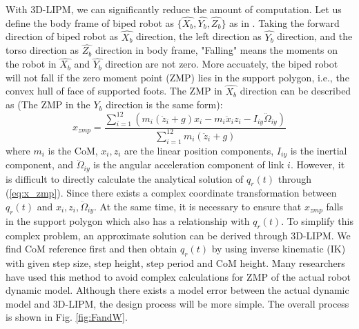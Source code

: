 \documentclass{ieeeaccess}
\begin{document}
With 3D-LIPM, we can significantly reduce the amount of computation. Let us define the body frame of biped robot as $\{ \widehat{X_b}, \widehat{Y_b}, \widehat{Z_b} \}$ as in \cite{ourrobot}. Taking the forward direction of biped robot as $\widehat{X_b}$ direction, the left direction as $\widehat{Y_b}$ direction, and the torso direction as $\widehat{Z_b}$ direction in body frame, "Falling" means the moments on the robot in $\widehat{X_b}$ and $\widehat{Y_b}$ direction are not zero. More accuately, the biped robot will not fall if the zero moment point (ZMP) lies in the support polygon, i.e., the convex hull of face of supported foots. The ZMP in $\widehat{X_b}$ direction can be described as \cite{huang2001planning} (The ZMP in the $\widehat{Y_b}$ direction is the same form):
\begin{equation} \label{eq:x_zmp}
    x_{zmp} = \frac{\sum_{i=1}^{12} (m_i(\ddot{z}_i+g)x_i - m_i\ddot{x}_iz_i - I_{iy}\ddot{\Omega}_{iy})}
                   {\sum_{i=1}^{12} m_i(\ddot{z}_i+g)}
\end{equation}
where $m_i$ is the CoM, $x_i, z_i$ are the linear position components, $I_{iy}$ is the inertial component, and $\ddot{\Omega}_{iy}$ is the angular acceleration component of link $i$. However, it is difficult to directly calculate the analytical solution of $q_r(t)$ through (\ref{eq:x_zmp}). Since there exists a complex coordinate transformation between $q_r(t)$ and $x_i, z_i, \ddot{\Omega}_{iy}$. At the same time, it is necessary to ensure that $x_{zmp}$ falls in the support polygon which also has a relationship with $q_r(t)$. To simplify this complex problem, an approximate solution can be derived through 3D-LIPM. We find CoM reference first and then obtain $q_r(t)$ by using inverse kinematic (IK) with given step size, step height, step period and CoM height. Many researchers have used this method to avoid complex calculations for ZMP of the actual robot dynamic model. Although there exists a model error between the actual dynamic model and 3D-LIPM, the design process will be more simple. The overall process is shown in Fig. \ref{fig:FandW}.
\end{document}
